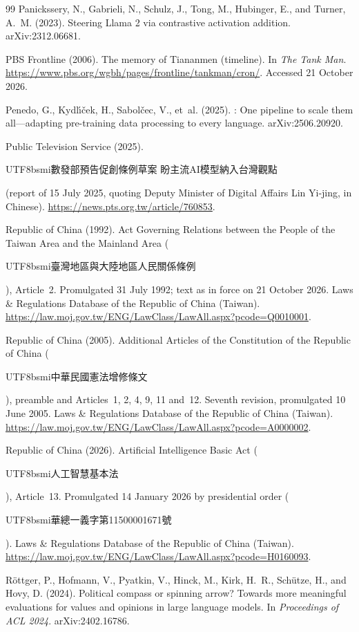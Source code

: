 \documentclass[11pt,a4paper]{article}
\newcommand{\zht}[1]{\begin{CJK}{UTF8}{bsmi}#1\end{CJK}}
\begin{document}
\begin{thebibliography}{99}
Panickssery, N., Gabrieli, N., Schulz, J., Tong, M., Hubinger, E., and Turner, A.~M. (2023).
\newblock Steering {Llama} 2 via contrastive activation addition.
\newblock arXiv:2312.06681.

PBS Frontline (2006).
\newblock The memory of Tiananmen (timeline). In \emph{The Tank Man}.
\newblock \url{https://www.pbs.org/wgbh/pages/frontline/tankman/cron/}. Accessed 21 October 2026.

Penedo, G., Kydl{\'\i}{\v{c}}ek, H., Sabol{\v{c}}ec, V., et~al. (2025).
: One pipeline to scale them all---adapting pre-training data processing to every language.
\newblock arXiv:2506.20920.

Public Television Service (2025).
\newblock \zht{數發部預告促創條例草案 盼主流AI模型納入台灣觀點} (report of 15 July 2025, quoting Deputy Minister of
Digital Affairs Lin Yi-jing, in Chinese).
\newblock \url{https://news.pts.org.tw/article/760853}.

Republic of China (1992).
\newblock Act Governing Relations between the People of the Taiwan Area and the Mainland Area
(\zht{臺灣地區與大陸地區人民關係條例}), Article~2.
\newblock Promulgated 31 July 1992; text as in force on 21 October 2026. Laws \& Regulations Database of the Republic
of China (Taiwan). \url{https://law.moj.gov.tw/ENG/LawClass/LawAll.aspx?pcode=Q0010001}.

Republic of China (2005).
\newblock Additional Articles of the Constitution of the Republic of China (\zht{中華民國憲法增修條文}), preamble
and Articles~1, 2, 4, 9, 11 and~12.
\newblock Seventh revision, promulgated 10 June 2005. Laws \& Regulations Database of the Republic of China (Taiwan).
\url{https://law.moj.gov.tw/ENG/LawClass/LawAll.aspx?pcode=A0000002}.

Republic of China (2026).
\newblock Artificial Intelligence Basic Act (\zht{人工智慧基本法}), Article~13.
\newblock Promulgated 14 January 2026 by presidential order (\zht{華總一義字第11500001671號}). Laws \& Regulations
Database of the Republic of China (Taiwan). \url{https://law.moj.gov.tw/ENG/LawClass/LawAll.aspx?pcode=H0160093}.

R{\"o}ttger, P., Hofmann, V., Pyatkin, V., Hinck, M., Kirk, H.~R., Sch{\"u}tze, H., and Hovy, D. (2024).
\newblock Political compass or spinning arrow? Towards more meaningful evaluations for values and opinions in large
language models.
\newblock In \emph{Proceedings of ACL 2024}. arXiv:2402.16786.


\end{thebibliography}
\end{document}
